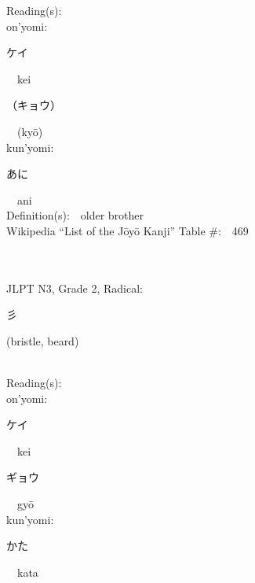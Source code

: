 \begin{multicols}{2}
Reading(s):\ \ \\
{\hspace*{1em}}on'yomi:\ \ \\
{\hspace*{2em}}{\begin{CJK}{UTF8}{min} ケイ \end{CJK}}\ \ kei\ \ \\
{\hspace*{2em}}{\begin{CJK}{UTF8}{min} （キョウ） \end{CJK}}\ \ (ky\=o)\ \ \\
{\hspace*{1em}}kun'yomi:\ \ \\
{\hspace*{2em}}{\begin{CJK}{UTF8}{min} あに \end{CJK}}\ \ ani\ \ \\
Definition(s):\ \ older brother \\
Wikipedia ``List of the J\=oy\=o Kanji'' Table \#:\ \ 469 \\
\ \ \\
{\fontsize{34pt}{40pt}  }\ \ \\  %
{JLPT N3, Grade 2, Radical:\ \ {\begin{CJK}{UTF8}{min} 彡 \end{CJK}} (bristle, beard) } \\
Reading(s):\ \ \\
{\hspace*{1em}}on'yomi:\ \ \\
{\hspace*{2em}}{\begin{CJK}{UTF8}{min} ケイ \end{CJK}}\ \ kei\ \ \\
{\hspace*{2em}}{\begin{CJK}{UTF8}{min} ギョウ \end{CJK}}\ \ gy\=o\ \ \\
{\hspace*{1em}}kun'yomi:\ \ \\
{\hspace*{2em}}{\begin{CJK}{UTF8}{min} かた \end{CJK}}\ \ kata\ \ \\

\end{multicols}
